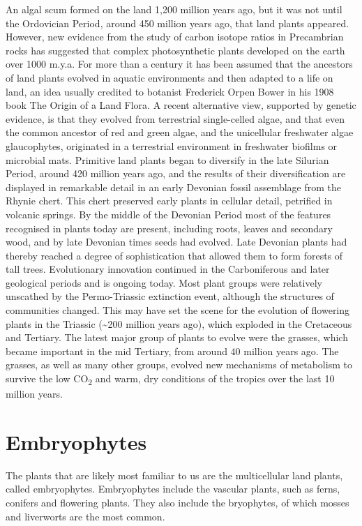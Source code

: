 An algal scum formed on the land 1,200 million years ago, but it was not until the Ordovician Period, around 450 million years ago, that land plants appeared. However, new evidence from the study of carbon isotope ratios in Precambrian rocks has suggested that complex photosynthetic plants developed on the earth over 1000 m.y.a. For more than a century it has been assumed that the ancestors of land plants evolved in aquatic environments and then adapted to a life on land, an idea usually credited to botanist Frederick Orpen Bower in his 1908 book The Origin of a Land Flora. A recent alternative view, supported by genetic evidence, is that they evolved from terrestrial single-celled algae, and that even the common ancestor of red and green algae, and the unicellular freshwater algae glaucophytes, originated in a terrestrial environment in freshwater biofilms or microbial mats. Primitive land plants began to diversify in the late Silurian Period, around 420 million years ago, and the results of their diversification are displayed in remarkable detail in an early Devonian fossil assemblage from the Rhynie chert. This chert preserved early plants in cellular detail, petrified in volcanic springs. By the middle of the Devonian Period most of the features recognised in plants today are present, including roots, leaves and secondary wood, and by late Devonian times seeds had evolved. Late Devonian plants had thereby reached a degree of sophistication that allowed them to form forests of tall trees. Evolutionary innovation continued in the Carboniferous and later geological periods and is ongoing today. Most plant groups were relatively unscathed by the Permo-Triassic extinction event, although the structures of communities changed. This may have set the scene for the evolution of flowering plants in the Triassic (\textasciitilde200 million years ago), which exploded in the Cretaceous and Tertiary. The latest major group of plants to evolve were the grasses, which became important in the mid Tertiary, from around 40 million years ago. The grasses, as well as many other groups, evolved new mechanisms of metabolism to survive the low CO\textsubscript{2} and warm, dry conditions of the tropics over the last 10 million years.

\hypertarget{embryophytes}{%
\section{Embryophytes}\label{embryophytes}}

The plants that are likely most familiar to us are the multicellular land plants, called embryophytes. Embryophytes include the vascular plants, such as ferns, conifers and flowering plants. They also include the bryophytes, of which mosses and liverworts are the most common.

